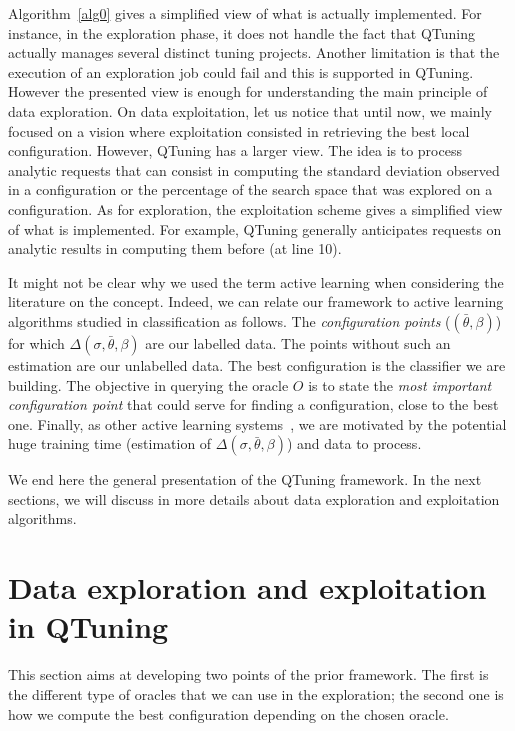 \documentclass[10pt, conference, compsocconf]{IEEEtran}
\begin{document}
Algorithm~\ref{alg0} gives a simplified view of what is actually implemented. For instance,  
in the exploration phase, it does not handle the fact that QTuning actually manages several distinct tuning projects.
Another limitation is that the execution of an exploration job could fail and this is supported in QTuning. 
However the presented view is enough for understanding the main principle of data exploration. 
On data exploitation, let us notice that until now, we mainly focused on a vision where exploitation 
consisted in retrieving the best local configuration. However, QTuning has a larger view. The idea is to process 
analytic requests that can consist in computing the standard deviation observed in a configuration or the 
percentage of the search space that was explored on a configuration. As for exploration, the exploitation 
scheme gives a simplified view of what is implemented. For example, QTuning generally anticipates requests 
on analytic results in computing them before (at line 10). 

It might not be clear why we used the term active learning when considering the literature on the concept. 
Indeed, we can relate our framework to active learning algorithms studied in 
classification as follows. The {\it configuration points} ($(\bar{\theta}, \beta)$) for 
which  $\Delta(\sigma, \bar{\theta}, \beta)$ are our labelled data. The points without such an estimation 
are our unlabelled data. The best configuration is the classifier we are building. The objective  
in querying the oracle $O$ is to state the {\it most important configuration point} that could serve for finding a 
configuration, close to the best one. Finally, as other active learning systems~\cite{Chu:2011:UOA:2020408.2020444}, 
we are motivated by the potential huge training time (estimation of $\Delta(\sigma, \bar{\theta}, \beta)$) and  
data to process. 

We end here the general presentation of the QTuning framework. In the next sections, we will 
discuss in more details about data exploration and exploitation algorithms.



\section{Data exploration and exploitation in QTuning} \label{Exploration}

This section aims at developing two points of the prior framework. The
first is the different type of oracles that we can use in the
exploration; the second one is how we compute the best configuration
depending on the chosen oracle.
\end{document}

